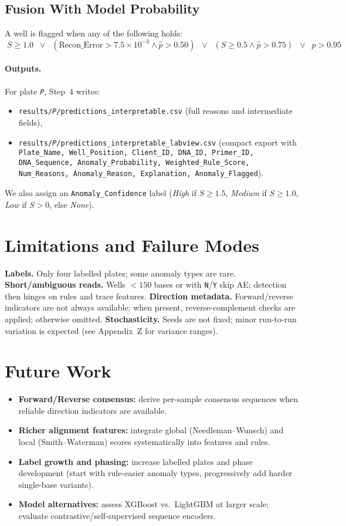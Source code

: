 \subsection{Fusion With Model Probability}
A well is flagged when any of the following holds:
\[
\boxed{\;
S \ge 1.0
\;\;\lor\;\;
(\text{Recon\_Error} > 7.5\times 10^{-3} \land \hat p > 0.50)
\;\;\lor\;\;
(S \ge 0.5 \land \hat p > 0.75)
\;\;\lor\;\;
\hat p > 0.95 \;
}
\]

\paragraph{Outputs.} For plate \texttt{\textit{P}}, Step~4 writes:
\begin{itemize}
  \item \texttt{results/\textit{P}/predictions\_interpretable.csv} (full reasons and intermediate fields),
  \item \texttt{results/\textit{P}/predictions\_interpretable\_labview.csv} (compact export with \texttt{Plate\_Name, Well\_Position, Client\_ID, DNA\_ID, Primer\_ID, DNA\_Sequence, Anomaly\_Probability, Weighted\_Rule\_Score, Num\_Reasons, Anomaly\_Reason, Explanation, Anomaly\_Flagged}).
\end{itemize}
We also assign an \texttt{Anomaly\_Confidence} label (\emph{High} if $S\ge 1.5$, \emph{Medium} if $S\ge 1.0$, \emph{Low} if $S>0$, else \emph{None}).



\section{Limitations and Failure Modes}
\label{sec:limits}
\textbf{Labels.} Only four labelled plates; some anomaly types are rare.  
\textbf{Short/ambiguous reads.} Wells $<150$ bases or with \texttt{N}/\texttt{Y} skip AE; detection then hinges on rules and trace features.  
\textbf{Direction metadata.} Forward/reverse indicators are not always available; when present, reverse-complement checks are applied; otherwise omitted.  
\textbf{Stochasticity.} Seeds are not fixed; minor run-to-run variation is expected (see Appendix~Z for variance ranges).

\section{Future Work}
\label{sec:future}
\begin{itemize}
  \item \textbf{Forward/Reverse consensus:} derive per-sample consensus sequences when reliable direction indicators are available.
  \item \textbf{Richer alignment features:} integrate global (Needleman–Wunsch) and local (Smith–Waterman) scores systematically into features and rules.
  \item \textbf{Label growth and phasing:} increase labelled plates and phase development (start with rule-easier anomaly types, progressively add harder single-base variants).
  \item \textbf{Model alternatives:} assess XGBoost vs.~LightGBM at larger scale; evaluate contrastive/self-supervised sequence encoders.
\end{itemize}


